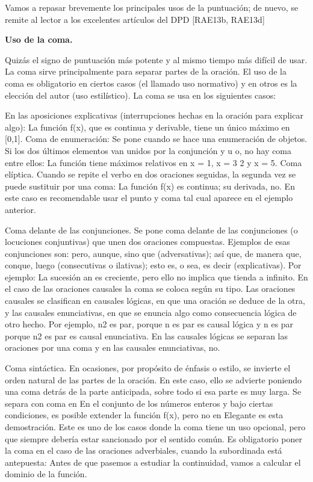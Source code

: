 Vamos a repasar brevemente los principales usos de la puntuación; de nuevo, se remite al lector a los excelentes artículos del DPD [RAE13b, RAE13d]

\textbf{Uso de la coma.}\par
Quizás el signo de puntuación más potente y al mismo tiempo más difícil de usar.
La coma sirve principalmente para separar partes de la oración. El uso de la coma es obligatorio en ciertos casos (el llamado uso normativo) y en otros es la elección del autor (uso estilístico). La coma se usa en los siguientes casos:


En las aposiciones explicativas (interrupciones hechas en la oración para explicar algo): La función f(x), que es continua y derivable, tiene un único máximo en [0,1].
Coma de enumeración: Se pone cuando se hace una enumeración de objetos. Si los dos últimos elementos van unidos por la conjunción y u o, no hay coma entre ellos: La función tiene máximos relativos en x = 1, x = 3
2 y x = 5.
Coma elíptica. Cuando se repite el verbo en dos oraciones seguidas, la segunda vez se puede sustituir por una coma: La función f(x) es continua; su derivada, no. En este caso es recomendable usar el punto y coma tal cual aparece en el ejemplo anterior.

Coma delante de las conjunciones. Se pone coma delante de las conjunciones (o locuciones conjuntivas) que unen dos oraciones compuestas. Ejemplos de esas conjunciones son: pero, aunque, sino que (adversativas); así que, de manera que, conque, luego (consecutivas o ilativas); esto es, o sea, es decir (explicativas). Por ejemplo: La sucesión an es creciente, pero ello no implica que tienda a infinito. En el caso de las oraciones causales la coma se coloca según su tipo. Las oraciones causales se clasifican en causales lógicas, en que una oración se deduce de la otra, y las causales enunciativas, en que se enuncia algo como consecuencia lógica de otro hecho. Por ejemplo, n2 es par, porque n es par es causal lógica y n es par porque n2 es par es causal enunciativa. En las causales lógicas se separan las oraciones por una coma y en las causales enunciativas, no.

Coma sintáctica. En ocasiones, por propósito de énfasis o estilo, se invierte el orden natural de las partes de la oración. En este caso, ello se advierte poniendo una coma detrás de la parte anticipada, sobre todo si esa parte es muy larga. Se separa con coma en En el conjunto de los números enteros y bajo ciertas condiciones, es posible extender la función f(x), pero no en Elegante es esta demostración. Este es uno de los casos donde la coma tiene un uso opcional, pero que siempre debería estar sancionado por el sentido común. Es obligatorio poner la coma en el caso de las oraciones adverbiales, cuando la subordinada está antepuesta: Antes de que pasemos a estudiar la continuidad, vamos a calcular el dominio de la función.

